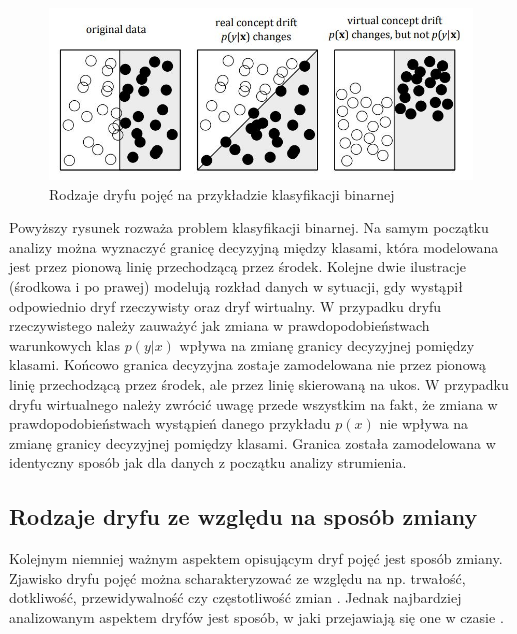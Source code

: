 \begin{figure}[h] 
    \centering\includegraphics[width=14cm]{figures/types_of_drift.JPG}
    \caption{Rodzaje dryfu pojęć na przykładzie klasyfikacji binarnej \cite{Article:DriftGama2}}
\end{figure}

\noindent Powyższy rysunek rozważa problem klasyfikacji binarnej. Na samym początku analizy można wyznaczyć granicę decyzyjną między klasami, która modelowana jest przez pionową linię przechodzącą przez środek. Kolejne dwie ilustracje (środkowa i po prawej) modelują rozkład danych w sytuacji, gdy wystąpił odpowiednio dryf rzeczywisty oraz dryf wirtualny. W przypadku dryfu rzeczywistego należy zauważyć jak zmiana w prawdopodobieństwach warunkowych klas $p(y|x)$ wpływa na zmianę granicy decyzyjnej pomiędzy klasami. Końcowo granica decyzyjna zostaje zamodelowana nie przez pionową linię przechodzącą przez środek, ale przez linię skierowaną na ukos. W przypadku dryfu wirtualnego należy zwrócić uwagę przede wszystkim na fakt, że zmiana w prawdopodobieństwach wystąpień danego przykładu $p(x)$ nie wpływa na zmianę granicy decyzyjnej pomiędzy klasami. Granica została zamodelowana w identyczny sposób jak dla danych z początku analizy strumienia.

\subsection{Rodzaje dryfu ze względu na sposób zmiany}

\noindent Kolejnym niemniej ważnym aspektem opisującym dryf pojęć jest sposób zmiany. Zjawisko dryfu pojęć można scharakteryzować ze względu na np. trwałość, dotkliwość, przewidywalność czy częstotliwość zmian \cite{Article:DriftType}\cite{Article:DriftType2}. Jednak najbardziej analizowanym aspektem dryfów jest sposób, w jaki przejawiają się one w czasie \cite{Article:DriftGama}\cite{Article:DriftType3}.

\newpage

